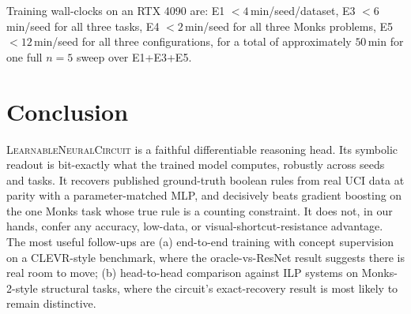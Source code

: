 \documentclass{article}
\newcommand{\circuit}{\textsc{LearnableNeuralCircuit}}
\begin{document}
Training wall-clocks on an RTX 4090 are: E1 $<\!4$\,min/seed/dataset, E3 $<\!6$\,min/seed for all three tasks, E4 $<\!2$\,min/seed for all three Monks problems, E5 $<\!12$\,min/seed for all three configurations, for a total of approximately $50$\,min for one full $n = 5$ sweep over E1+E3+E5.

\section{Conclusion}
\label{sec:conclusion}

\circuit{} is a faithful differentiable reasoning head.
Its symbolic readout is bit-exactly what the trained model computes, robustly across seeds and tasks.
It recovers published ground-truth boolean rules from real UCI data at parity with a parameter-matched MLP, and decisively beats gradient boosting on the one Monks task whose true rule is a counting constraint.
It does not, in our hands, confer any accuracy, low-data, or visual-shortcut-resistance advantage.
The most useful follow-ups are (a) end-to-end training with concept supervision on a CLEVR-style benchmark, where the oracle-vs-ResNet result suggests there is real room to move; (b) head-to-head comparison against ILP systems on Monks-2-style structural tasks, where the circuit's exact-recovery result is most likely to remain distinctive.


\end{document}
